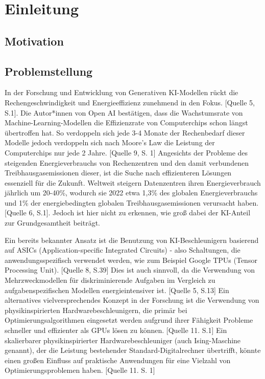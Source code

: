 \chapter{Einleitung}


\section{Motivation}
\section{Problemstellung}

In der Forschung und Entwicklung von Generativen KI-Modellen rückt die
Rechengeschwindigkeit und Energieeffizienz zunehmend in den Fokus. [Quelle 5,
S.1]. Die Autor*innen von Open AI bestätigen, dass die Wachstumsrate von
Machine-Learning-Modellen die Effizienzrate von Computerchips schon längst
übertroffen hat. So verdoppeln sich jede 3-4 Monate der Rechenbedarf dieser
Modelle jedoch verdoppeln sich nach Moore’s Law die Leistung der Computerchips
nur jede 2 Jahre. [Quelle 9, S. 1]
Angesichts der Probleme des steigenden Energieverbrauchs von Rechenzentren
und den damit verbundenen Treibhausgasemissionen dieser, ist die Suche nach
effizienteren Lösungen essenziell für die Zukunft. Weltweit steigern Datenzentren
ihren Energieverbrauch jährlich um 20-40\%, wodurch sie 2022 etwa 1,3\% des
globalen Energieverbrauchs und 1\% der energiebedingten globalen
Treibhausgasemissionen verursacht haben. [Quelle 6, S.1]. Jedoch ist hier nicht zu
erkennen, wie groß dabei der KI-Anteil zur Grundgesamtheit beiträgt.

Ein bereits bekannter Ansatz ist die Benutzung von KI-Beschleunigern basierend auf
ASICs (Application-specific Integrated Circuits) - also Schaltungen, die
anwendungsspezifisch verwendet werden, wie zum Beispiel Google TPUs (Tensor
Processing Unit). [Quelle 8, S.39] Dies ist auch sinnvoll, da die Verwendung von
Mehrzweckmodellen für diskriminierende Aufgaben im Vergleich zu
aufgabenspezifischen Modellen energieintensiver ist. [Quelle 5, S.13] Ein
alternatives vielversprechendes Konzept in der Forschung ist die Verwendung von
physikinspirierten Hardwarebeschleunigern, die primär bei Optimierungsalgorithmen
eingesetzt werden aufgrund ihrer Fähigkeit Probleme schneller und effizienter als
GPUs lösen zu können. [Quelle 11. S.1]
Ein skalierbarer physikinspirierter Hardwarebeschleuniger (auch Ising-Maschine
genannt), der die Leistung bestehender Standard-Digitalrechner übertrifft, könnte
einen großen Einfluss auf praktische Anwendungen für eine Vielzahl von
Optimierungsproblemen haben. [Quelle 11. S. 1]

